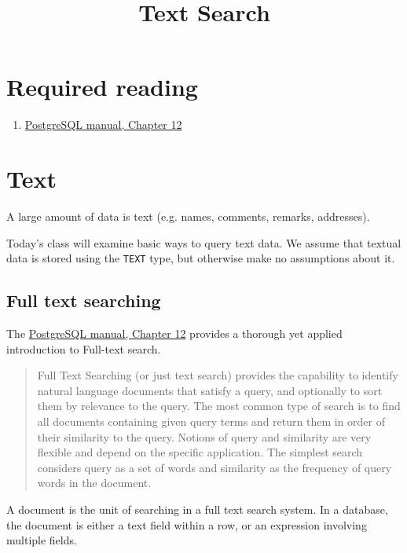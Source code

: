 \documentclass[slides]{pgnotes}
\title{Text Search}
\begin{document}
\maketitle

\section*{Required reading}

\begin{enumerate}
  
\item \href{https://www.postgresql.org/docs/current/textsearch-intro.html}{PostgreSQL manual, Chapter 12}
\end{enumerate}

\tableofcontents

\section{Text}

A large amount of data is text (e.g. names, comments, remarks, addresses).

Today's class will examine basic ways to query text data.
We assume that textual data is stored using the \texttt{TEXT} type, but otherwise make no assumptions about it.

\subsection{Full text searching}

The \href{https://www.postgresql.org/docs/current/textsearch.html}{PostgreSQL manual, Chapter 12} provides a thorough yet applied introduction to Full-text search.
\begin{quotation}
  Full Text Searching (or just text search) provides the capability to identify natural language documents that satisfy a query, and optionally to sort them by relevance to the query. The most common type of search is to find all documents containing given query terms and return them in order of their similarity to the query. Notions of query and similarity are very flexible and depend on the specific application. The simplest search considers query as a set of words and similarity as the frequency of query words in the document.
\end{quotation}
A document is the unit of searching in a full text search system.
In a database, the document is either a text field within a row, or an expression involving multiple fields. 
\end{document}
